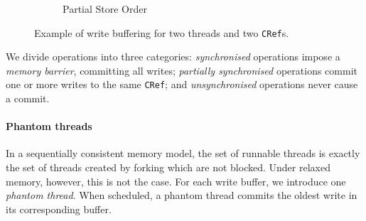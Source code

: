 \begin{figure}
\begin{subfigure}{0.3\textwidth}
    \caption{Partial Store Order}
  \end{subfigure}
  \caption{Example of write buffering for two threads and two \texttt{CRef}s.}
  \label{fig:wb}
\end{figure}

We divide operations into three categories: \emph{synchronised}
operations impose a \emph{memory barrier}, committing all writes;
\emph{partially synchronised} operations commit one or more writes to
the same \verb|CRef|; and \emph{unsynchronised} operations never cause
a commit.

\paragraph{Phantom threads}
In a sequentially consistent memory model, the set of runnable threads is
exactly the set of threads created by forking which are not blocked.  Under
relaxed memory, however, this is not the case.  For each write buffer, we
introduce one \emph{phantom thread}.  When scheduled, a phantom thread
commits the oldest write in its corresponding buffer.

